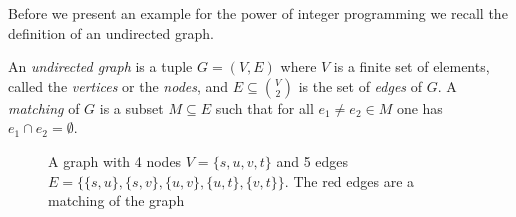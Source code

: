 Before we present an example for the power of integer programming we
recall the definition of an undirected graph. 

\begin{definition} 
  An \emph{undirected graph} is a tuple $G = (V,E)$ where $V$ is a
  finite set of elements, called the \emph{vertices} or the \emph{nodes}, and $E\subseteq\binom{V}{2}$ is the
  set of \emph{edges} of $G$.  A \emph{matching} of $G$ is a subset
  $M\subseteq E$ such that for all $e_1\neq e_2\in M$ one has $e_1\cap e_2 = \emptyset$. 
\end{definition}








\begin{figure}
\begin{center}
\end{center}
  
  \caption{A graph with 4 nodes $V = \{s,u,v,t\}$ and 5 edges $E = \{
    \{s,u\}, \{s,v\}, \{u,v\}, \{u,t\},\{v,t\} \}$. The red edges
    are a matching of the graph}
\end{figure}



